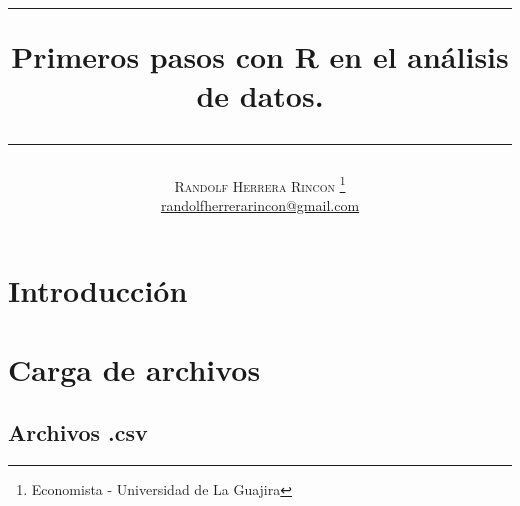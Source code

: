 \documentclass[12pt,a4paper]{article}
\title{   \begin{center}\rule{0.9\textwidth}{0.1mm} \end{center}
    {\Huge\textbf{Primeros pasos con R en el análisis de datos.}}
    \begin{center}\rule{0.9\textwidth}{0.1mm} \end{center}
}
\author{\textsc{Randolf Herrera Rincon}
    \thanks{Economista - Universidad de La Guajira}\\
    \normalsize 
    \href{mailto:randolfherrerarincon@gmail.com}{randolfherrerarincon@gmail.com}   
}
\begin{document}
\maketitle
\tableofcontents
\newpage
\section{Introducción}
\newpage
\section{Carga de archivos}
\subsection{Archivos .csv}


\newpage

     
\end{document}

